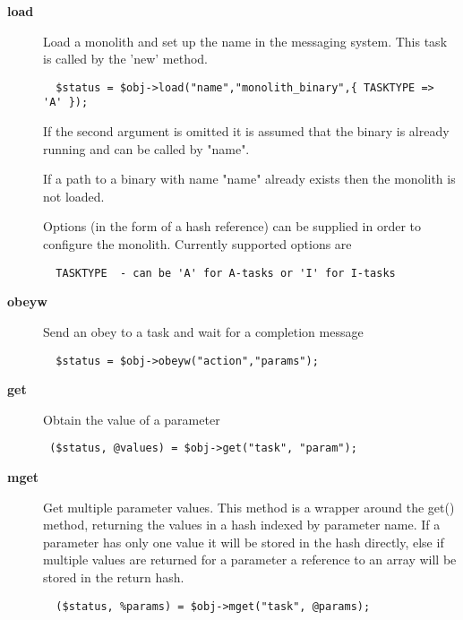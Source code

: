 \begin{description}
\begin{description}
\begin{description}
\item[{\textbf{load}}] \mbox{}

Load a monolith and set up the name in the messaging system.
This task is called by the 'new' method.

\begin{verbatim}
  $status = $obj->load("name","monolith_binary",{ TASKTYPE => 'A' });
\end{verbatim}


If the second argument is omitted it is assumed that the binary
is already running and can be called by "name".



If a path to a binary with name "name" already exists then the monolith
is not loaded.



Options (in the form of a hash reference) can be supplied
in order to configure the monolith. Currently supported options
are

\begin{verbatim}
  TASKTYPE  - can be 'A' for A-tasks or 'I' for I-tasks
\end{verbatim}

\item[{\textbf{obeyw}}] \mbox{}

Send an obey to a task and wait for a completion message

\begin{verbatim}
  $status = $obj->obeyw("action","params");
\end{verbatim}

\item[{\textbf{get}}] \mbox{}

Obtain the value of a parameter

\begin{verbatim}
 ($status, @values) = $obj->get("task", "param");
\end{verbatim}

\item[{\textbf{mget}}] \mbox{}

Get multiple parameter values. This method is a wrapper around
the get() method, returning the values in a hash indexed
by parameter name. If a parameter has only one value it will
be stored in the hash directly, else if multiple values are
returned for a parameter a reference to an array will be stored
in the return hash.

\begin{verbatim}
  ($status, %params) = $obj->mget("task", @params);
\end{verbatim}



\end{description}
\end{description}
\end{description}
